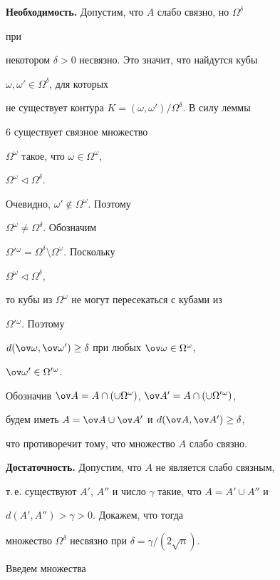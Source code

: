 \begin{pf} 


{\bf Необходимость.} Допустим, что $A$ слабо связно, но $\Omega^\delta$ 


при 


некотором $\delta>0$ несвязно. Это значит, что найдутся кубы 


$\omega,\omega'\in\Omega^\delta$, для которых 


не существует контура $K=(\omega,\omega')/\Omega^\delta$. В силу леммы 


6 существует связное множество 


$\Omega^\omega$ такое, что $\omega\in\Omega^\omega$, 


$\Omega^\omega\vartriangleleft\Omega^\delta$. 


 


Очевидно, $\omega'\notin\Omega^\omega$. Поэтому 


$\Omega^\omega\ne\Omega^\delta$. Обозначим 


$\Omega'{}^\omega=\Omega^\delta\setminus\Omega^\omega$. Поскольку 


$\Omega^\omega\vartriangleleft\Omega^\delta$, 


то кубы из $\Omega^\omega$ не могут пересекаться с кубами из 


$\Omega'{}^\omega$. Поэтому 


$d(\ov\omega,\ov\omega')\ge\delta$ при любых $\ov\omega\in\Omega^\omega$, 


$\ov\omega'\in\Omega'{}^\omega$. 


Обозначив $\ov A=A\cap(\cup\Omega^\omega)$, $\ov 


A'=A\cap(\cup\Omega'{}^\omega)$, 


будем иметь $A=\ov A\cup\ov A'$ и $d(\ov A,\ov A')\ge\delta$, 


что противоречит тому, что множество $A$ слабо связно. 


\smallskip 


 


{\bf Достаточность.} Допустим, что $A$ не является слабо связным, 


т.\,е. существуют $A'$, $A''$ и число $\gamma$ такие, что $A=A'\cup A''$ и 


$d(A',A'')>\gamma>0$. Докажем, что тогда 


множество $\Omega^\delta$ несвязно при $\delta=\gamma/(2\sqrt{n})$. 


Введем множества 



\end{pf}
